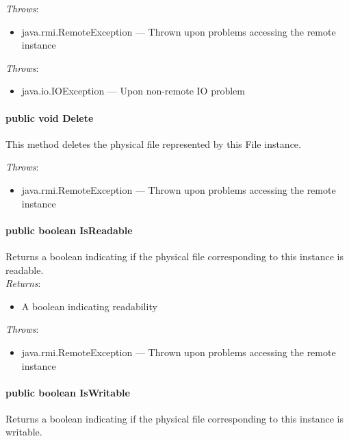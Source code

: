 \documentclass[$Date: 2003/06/26 19:29:31 $]{glabarticle}
\begin{document}
 \textit{Throws}:
 \begin{itemize}
 \item[] java.rmi.RemoteException --- Thrown upon problems accessing the remote instance 
 \end{itemize}
 
\textit{Throws}:
\begin{itemize}
\item[] java.io.IOException --- Upon non-remote IO problem 
\end{itemize}
 
\paragraph{public void Delete}

This method deletes the physical file represented by this File instance.

 \textit{Throws}:
 \begin{itemize}
 \item[] java.rmi.RemoteException --- Thrown upon problems accessing the remote instance 
 \end{itemize}
 
\paragraph{public boolean IsReadable}

Returns a boolean indicating if the physical file corresponding to
this instance is readable.\\

\textit{Returns}:
\begin{itemize}
\item[] A boolean indicating readability
\end{itemize}

 \textit{Throws}:
 \begin{itemize}
 \item[] java.rmi.RemoteException --- Thrown upon problems accessing the remote instance 
 \end{itemize}
 
\paragraph{public boolean IsWritable}

Returns a boolean indicating if the physical file corresponding to
this instance is writable.\\
\end{document}
